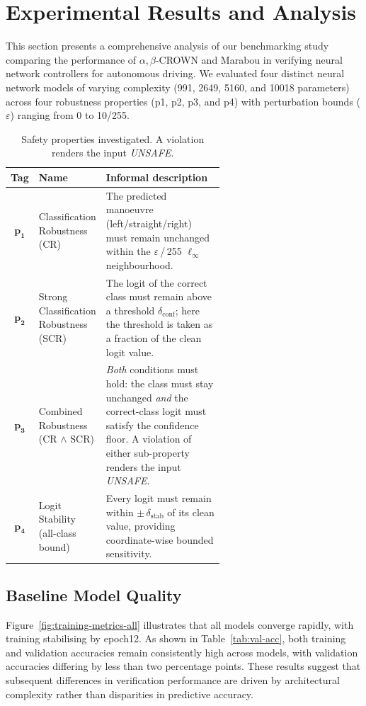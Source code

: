 \section{Experimental Results and Analysis}
\label{sec:results}
This section presents a comprehensive analysis of our benchmarking study comparing the performance of $\alpha, \beta$-CROWN and Marabou in verifying neural network controllers for autonomous driving. We evaluated four distinct neural network models of varying complexity (991, 2649, 5160, and 10018 parameters) across four robustness properties (p1, p2, p3, and p4) with perturbation bounds ($\varepsilon$) ranging from 0 to 10/255.

\begin{table}[ht]
    \centering
    \caption{Safety properties investigated.  A violation renders the input \textit{UNSAFE}.\label{tab:prop-defs}}
    \begin{tabular}{clp{0.6\linewidth}}
        \toprule
        Tag & Name & Informal description \\ \midrule
        $\mathbf{p_1}$ & Classification Robustness (CR) & The predicted manoeuvre (left/straight/right) must remain unchanged within the $\varepsilon$\,\slash\,255 $\ell_\infty$ neighbourhood. \\[2pt]
        $\mathbf{p_2}$ & Strong Classification Robustness (SCR) & The logit of the correct class must remain above a threshold $\delta_{\text{conf}}$; here the threshold is taken as a fraction of the clean logit value. \\[2pt]
        $\mathbf{p_3}$ & Combined Robustness (CR $\wedge$ SCR) & \textit{Both} conditions must hold: the class must stay unchanged \emph{and} the correct-class logit must satisfy the confidence floor. A violation of either sub-property renders the input \textit{UNSAFE}. \\[2pt]
        $\mathbf{p_4}$ & Logit Stability (all-class bound) & Every logit must remain within $\pm\,\delta_{\text{stab}}$ of its clean value, providing coordinate-wise bounded sensitivity. \\ 
        \bottomrule
    \end{tabular}
\end{table}

\subsection{Baseline Model Quality}\label{subsec:training}
Figure~\ref{fig:training-metrics-all} illustrates that all models converge rapidly, with training stabilising by epoch12. As shown in Table~\ref{tab:val-acc}, both training and validation accuracies remain consistently high across models, with validation accuracies differing by less than two percentage points. These results suggest that subsequent differences in verification performance are driven by architectural complexity rather than disparities in predictive accuracy.


